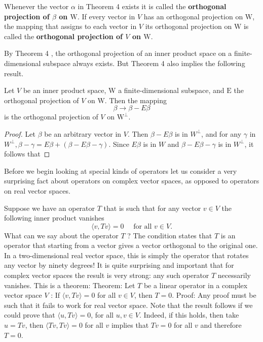 \documentclass[main.tex]{subfiles}
\begin{document}

\begin{definition}Whenever the vector $\alpha$ in Theorem 4 exists it is called the \textbf{orthogonal projection of $\beta$ on $\mathrm{W}$}. If every vector in $V$ has an orthogonal projection on $\mathrm{W}$, the mapping that assigns to each vector in $V$ its orthogonal projection on $\mathrm{W}$ is called the \textbf{orthogonal projection of $V$ on $\mathrm{W}$}.\end{definition}

By Theorem 4 , the orthogonal projection of an inner product space on a finite-dimensional subspace always exists. But Theorem 4 also implies the following result.

\begin{corollary}
    Let $V$ be an inner product space, W a finite-dimensional subspace, and $\mathrm{E}$ the orthogonal projection of $V$ on $\mathrm{W}$. Then the mapping
    $$
    \beta \rightarrow \beta-E \beta
    $$
    is the orthogonal projection of $V$ on $\mathrm{W}^{\perp}$.
\end{corollary}
\begin{proof}
    Let $\beta$ be an arbitrary vector in $V$. Then $\beta-E \beta$ is in $W^{\perp}$, and for any $\gamma$ in $W^{\perp}, \beta-\gamma=E \beta+(\beta-E \beta-\gamma)$. Since $E \beta$ is in $W$ and $\beta-E \beta-\gamma$ is in $W^{\perp}$, it follows that
\end{proof}


Before we begin looking at special kinds of operators let us consider a very surprising fact about operators on complex vector spaces, as opposed to operators on real vector spaces.

Suppose we have an operator $T$ that is such that for any vector $v \in V$ the following inner product vanishes
$$
\langle v, T v\rangle=0 \quad \text { for all } v \in V .
$$
What can we say about the operator $T$ ? The condition states that $T$ is an operator that starting from a vector gives a vector orthogonal to the original one. In a two-dimensional real vector space, this is simply the operator that rotates any vector by ninety degrees! It is quite surprising and important that for complex vector spaces the result is very strong: any such operator $T$ necessarily vanishes. This is a theorem:
Theorem: Let $T$ be a linear operator in a complex vector space $V$ :
If $\langle v, T v\rangle=0$ for all $v \in V$, then $T=0$.
Proof: Any proof must be such that it fails to work for real vector space. Note that the result follows if we could prove that $\langle u, T v\rangle=0$, for all $u, v \in V$. Indeed, if this holds, then take $u=T v$, then $\langle T v, T v\rangle=0$ for all $v$ implies that $T v=0$ for all $v$ and therefore $T=0$.
\end{document}
